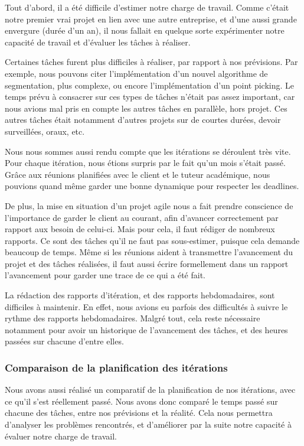 \documentclass[12pt,titlepage,french]{article}
\begin{document}
Tout d'abord, il a été difficile d'estimer notre charge de travail. Comme c'était notre premier vrai projet en lien avec une autre entreprise, et d'une aussi grande envergure (durée d'un an), il nous fallait en quelque sorte expérimenter notre capacité de travail et d'évaluer les tâches à réaliser.

Certaines tâches furent plus difficiles à réaliser, par rapport à nos prévisions. Par exemple, nous pouvons citer l'implémentation d'un nouvel algorithme de segmentation, plus complexe, ou encore l'implémentation d'un point picking. Le temps prévu à consacrer sur ces types de tâches n'était pas assez important, car nous avions mal pris en compte les autres tâches en parallèle, hors projet. Ces autres tâches était notamment d'autres projets sur de courtes durées, devoir surveillées, oraux, etc. \newline

Nous nous sommes aussi rendu compte que les itérations se déroulent très vite. Pour chaque itération, nous étions surpris par le fait qu'un mois s'était passé. Grâce aux réunions planifiées avec le client et le tuteur académique, nous pouvions quand même garder une bonne dynamique pour respecter les deadlines. \newline

De plus, la mise en situation d'un projet agile nous a fait prendre conscience de l'importance de garder le client au courant, afin d'avancer correctement par rapport aux besoin de celui-ci. Mais pour cela, il faut rédiger de nombreux rapports. Ce sont des tâches qu'il ne faut pas sous-estimer, puisque cela demande beaucoup de temps. Même si les réunions aident à transmettre l'avancement du projet et des tâches réalisées, il faut aussi écrire formellement dans un rapport l'avancement pour garder une trace de ce qui a été fait.

La rédaction des rapports d'itération, et des rapports hebdomadaires, sont difficiles à maintenir. En effet, nous avions eu parfois des difficultés à suivre le rythme des rapports hebdomadaires. Malgré tout, cela reste nécessaire notamment pour avoir un historique de l'avancement des tâches, et des heures passées sur chacune d'entre elles.

\subsubsection{Comparaison de la planification des itérations}

Nous avons aussi réalisé un comparatif de la planification de nos itérations, avec ce qu'il s'est réellement passé. Nous avons donc comparé le temps passé sur chacune des tâches, entre nos prévisions et la réalité. Cela nous permettra d'analyser les problèmes rencontrés, et d'améliorer par la suite notre capacité à évaluer notre charge de travail.
\end{document}
